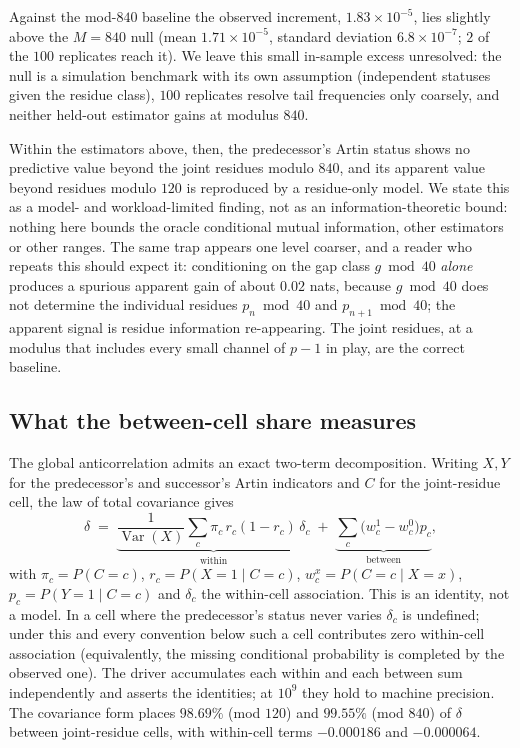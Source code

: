 Against the mod-$840$ baseline the observed increment, $1.83\times10^{-5}$, lies slightly above
the $M=840$ null (mean $1.71\times10^{-5}$, standard deviation $6.8\times10^{-7}$; $2$ of the $100$
replicates reach it). We leave this small in-sample excess unresolved: the null is a simulation
benchmark with its own assumption (independent statuses given the residue class), $100$
replicates resolve tail frequencies only coarsely, and neither held-out estimator gains at
modulus $840$.

Within the estimators above, then, the predecessor's Artin status shows no predictive value beyond
the joint residues modulo $840$, and its apparent value beyond residues modulo $120$ is
reproduced by a residue-only model. We state this as a model- and workload-limited finding, not as an
information-theoretic bound: nothing here bounds the oracle conditional mutual information, other
estimators or other ranges. The same trap appears one level coarser, and a reader who repeats this
should expect it: conditioning on the gap class $g \bmod 40$ \emph{alone} produces a spurious
apparent gain of about $0.02$ nats, because $g \bmod 40$ does not determine the individual
residues $p_n \bmod 40$ and $p_{n+1} \bmod 40$; the apparent signal is residue information
re-appearing. The joint residues, at a modulus that includes every small channel of $p-1$ in
play, are the correct baseline.

\subsection*{What the between-cell share measures}
The global anticorrelation admits an exact two-term decomposition. Writing $X,Y$ for the
predecessor's and successor's Artin indicators and $C$ for the joint-residue cell, the law of
total covariance gives
\[
\delta \;=\; \underbrace{\frac{1}{\operatorname{Var}(X)}\sum_c \pi_c\, r_c(1-r_c)\,\delta_c}_{\text{within}}
      \;+\; \underbrace{\sum_c \bigl(w_c^{1}-w_c^{0}\bigr) p_c}_{\text{between}},
\]
with $\pi_c = P(C{=}c)$, $r_c = P(X{=}1\mid C{=}c)$, $w_c^{x}=P(C{=}c\mid X{=}x)$,
$p_c=P(Y{=}1\mid C{=}c)$ and $\delta_c$ the within-cell association. This is an identity, not a
model. In a cell where the predecessor's status never varies $\delta_c$ is undefined; under this
and every convention below such a cell contributes zero within-cell association (equivalently,
the missing conditional probability is completed by the observed one). The driver accumulates
each within and each between sum independently and asserts the identities; at $10^9$ they hold
to machine precision. The covariance form places $98.69\%$ (mod $120$) and $99.55\%$ (mod $840$)
of $\delta$ between joint-residue cells, with within-cell terms $-0.000186$ and $-0.000064$.

